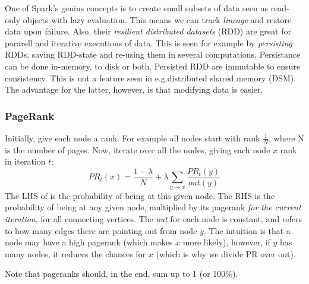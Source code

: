 One of Spark's genius concepts is to create small subsets of data seen as read-only objects with lazy evaluation.
This means we can track \textit{lineage} and restore data upon failure. Also, their \textit{resilient distributed datasets} (RDD) are great for pararell and iterative executions of data.
This is seen for example by \textit{persisting} RDDs, saving RDD-state and re-using them in several computations.
Persistance can be done in-memory, to disk or both. Persisted RDD are immutable to ensure consistency.
This is not a feature seen in e.g.\@ distributed shared memory (DSM). The advantage for the latter, however,
is that modifying data is easier.

\subsubsection{PageRank}
Initially, give each node a rank. For example all nodes start with rank $\frac{1}{N}$, where N is the number of pages.
Now, iterate over all the nodes, giving each node $x$ rank in iteration $t$:
\begin{equation}\label{eq:pagerank}
    PR_{t}(x) = \frac{1 - \lambda}{N} + \lambda\sum\limits_{{y \rightarrow x}{}}{\frac{PR_{t}(y)}{out(y)}}
\end{equation}
The LHS of  is the probability of being at this given node. The RHS is the probability of being at any given node, multiplied by its pagerank \textit{for the current iteration}, for all connecting vertices. The \textit{out} for each node is constant, and refers to how many edges there are pointing out from node $y$. The intuition is that a node may have a high pagerank (which makes $x$ more likely), however, if $y$ has many nodes, it reduces the chances for $x$ (which is why we divide PR over out).

Note that pageranks should, in the end, sum up to 1 (or 100\%). 


